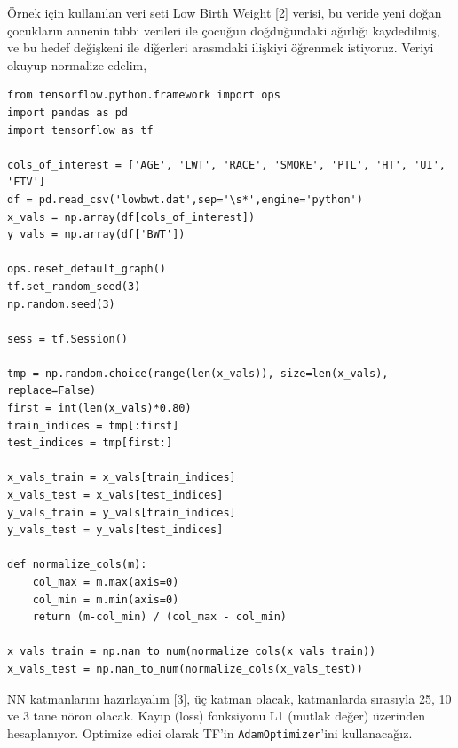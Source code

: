 \documentclass[12pt,fleqn]{article}\usepackage{../../common}
\begin{document}
Örnek için kullanılan veri seti Low Birth Weight [2] verisi, bu veride
yeni doğan çocukların annenin tıbbi verileri ile çocuğun doğduğundaki
ağırlığı kaydedilmiş, ve bu hedef değişkeni ile diğerleri arasındaki
ilişkiyi öğrenmek istiyoruz. Veriyi okuyup normalize edelim,

\begin{verbatim}
from tensorflow.python.framework import ops
import pandas as pd
import tensorflow as tf

cols_of_interest = ['AGE', 'LWT', 'RACE', 'SMOKE', 'PTL', 'HT', 'UI', 'FTV']
df = pd.read_csv('lowbwt.dat',sep='\s*',engine='python')
x_vals = np.array(df[cols_of_interest])
y_vals = np.array(df['BWT'])

ops.reset_default_graph()
tf.set_random_seed(3)
np.random.seed(3)

sess = tf.Session()

tmp = np.random.choice(range(len(x_vals)), size=len(x_vals), replace=False)
first = int(len(x_vals)*0.80)
train_indices = tmp[:first]
test_indices = tmp[first:]

x_vals_train = x_vals[train_indices]
x_vals_test = x_vals[test_indices]
y_vals_train = y_vals[train_indices]
y_vals_test = y_vals[test_indices]

def normalize_cols(m):
    col_max = m.max(axis=0)
    col_min = m.min(axis=0)
    return (m-col_min) / (col_max - col_min)
    
x_vals_train = np.nan_to_num(normalize_cols(x_vals_train))
x_vals_test = np.nan_to_num(normalize_cols(x_vals_test))
\end{verbatim}

NN katmanlarını hazırlayalım [3], üç katman olacak, katmanlarda sırasıyla
25, 10 ve 3 tane nöron olacak. Kayıp (loss) fonksiyonu L1 (mutlak değer)
üzerinden hesaplanıyor. Optimize edici olarak TF'in
\verb!AdamOptimizer!'ini kullanacağız.
\end{document}
